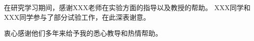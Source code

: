 
\begin{acknowledgements}

在研究学习期间，感谢XXX老师在实验方面的指导以及教授的帮助。
XXX同学和XXX同学参与了部分试验工作，在此深表谢意。

衷心感谢他们多年来给予我的悉心教导和热情帮助。


\end{acknowledgements}
